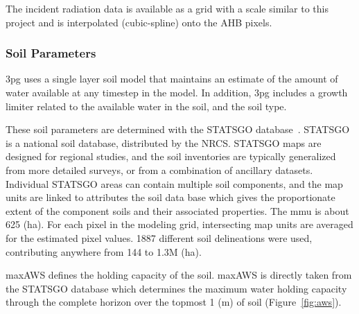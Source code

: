 \documentclass[preprint,review,12pt]{elsarticle}
\begin{document}
The incident radiation data is available as a grid with a scale
similar to this project and is interpolated (cubic-spline) onto the
\ac{AHB} pixels.

\subsubsection{Soil Parameters}
\label{sec:soil}

\ac{3pg} uses a single layer soil model that maintains an estimate of
the amount of water available at any timestep in the model.  In
addition, \ac{3pg} includes a growth limiter related to the available
water in the soil, and the soil type.

These soil parameters are determined with the \acf{STATSGO}
database~\cite{STATSGO}.  \ac{STATSGO} is a national soil database,
distributed by the \ac{NRCS}.  \ac{STATSGO} maps are designed for
regional studies, and the soil inventories are typically generalized
from more detailed surveys, or from a combination of ancillary
datasets.  Individual \ac{STATSGO} areas can contain multiple soil
components, and the map units are linked to attributes the soil data
base which gives the proportionate extent of the component soils and
their associated properties.  The \ac{mmu} is about 625 (ha).  For
each pixel in the modeling grid, intersecting map units are averaged
for the estimated pixel values.  1887 different soil delineations were
used, contributing anywhere from 144 to 1.3M (ha).

\ac{maxAWS} defines the holding capacity of the soil.
\ac{maxAWS} is directly taken from the \ac{STATSGO} database which
determines the maximum water holding capacity through the complete
horizon over the topmost 1 (m) of soil (Figure~\ref{fig:aws}).
\end{document}
